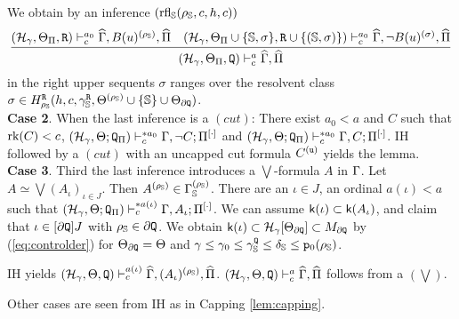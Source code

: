 \documentclass{article}
\newcommand{\mS}{\mathbb{S}}
\begin{document}
We obtain by an inference $({\rm rfl}_{\mS}(\rho_{\mS},c,h,c))$
{\small
\[
\infer
{
(\mathcal{H}_{\gam},\Tht_{\Pi},{\tt Q})\vdash^{a}_{c}
\widehat{\Gamma},\widehat{\Pi}
}
{
(\mathcal{H}_{\gam},\Tht_{\Pi},{\tt R})\vdash^{a_{0}}_{c}
\widehat{\Gamma},B(u)^{(\rho_{\mS})},\widehat{\Pi}
&
(\mathcal{H}_{\gamma},\Tht_{\Pi}\cup\{\mS,\sig\}, {\tt R}\cup\{(\mS,\sigma)\}
)\vdash^{a_{0}}_{c}
\widehat{\Gamma},\lnot B(u)^{(\sigma)},\widehat{\Pi}
}
\]
}
in the right upper sequents
$\sigma$ ranges over the resolvent class 
$\sigma\in H^{{\tt R}}_{\rho_{\mS}}(h,c,\gam^{{\tt R}}_{\mS},\Tht^{(\rho_{\mS})}\cup\{\mS\}\cup
\Tht_{\partial{\tt Q}})$.
\\
\textbf{Case 2}. 
When the last inference is a 
$(cut)$:
There exist $a_{0}<a$ and $C$
such that $\mbox{{\rm rk}}(C)<c$,
$(\mathcal{H}_{\gamma},\Theta;{\tt Q}_{\Pi})
\vdash^{* a_{0}}_{c}
\Gamma,\lnot C;\Pi^{[\cdot]}$
and
$(\mathcal{H}_{\gamma},\Theta;{\tt Q}_{\Pi})
\vdash^{* a_{0}}_{c}\Gamma,C;\Pi^{[\cdot]}$.
IH followed by a $(cut)$ with an uncapped cut formula $C^{({\tt u})}$ yields the lemma.
\\
\textbf{Case 3}.  
Third the last inference introduces
a $\bigvee$-formula $A$ in $\Gamma$.
Let $A\simeq\bigvee\left(A_{\iota}\right)_{\iota\in J}$.
Then $A^{(\rho_{\mS})}\in\Gam_{\mS}^{(\rho_{\mS})}$.
There are an $\iota\in J$, an ordinal
 $a(\iota)<a$
such that
$(\mathcal{H}_{\gamma},\Theta;{\tt Q}_{\Pi})\vdash^{* a(\iota)}_{c}
\Gamma,A_{\iota};\Pi^{[\cdot]}$.
We can assume ${\sf k}(\iota)\subset{\sf k}(A_{\iota})$, and claim that 
$\iota\in [\partial{\tt Q}]J$ with $\rho_{\mS}\in\partial{\tt Q}$.
We obtain
${\sf k}(\iota)\subset{\cal H}_{\gamma}[\Theta_{\partial{\tt Q}}] \subset M_{\partial{\tt Q}}$
by (\ref{eq:controlder}) for $\Theta_{\partial{\tt Q}}=\Theta$
and
$\gam\leq\gam_{0}\leq\gam^{{\tt Q}}_{\mS}\leq\del_{\mS}\leq{\tt p}_{0}(\rho_{\mS})$.


IH yields $(\mathcal{H}_{\gamma},\Theta,{\tt Q})
\vdash^{a(\iota)}_{c}
\widehat{\Gamma},
(A_{\iota})^{(\rho_{\mS})},\widehat{\Pi}$.
$(\mathcal{H}_{\gamma},\Theta,{\tt Q})
\vdash^{a}_{c}
\widehat{\Gamma},\widehat{\Pi}$ 
follows from a $(\bigvee)$.

Other cases are seen from IH as in Capping \ref{lem:capping}.
\eprf
\end{document}
